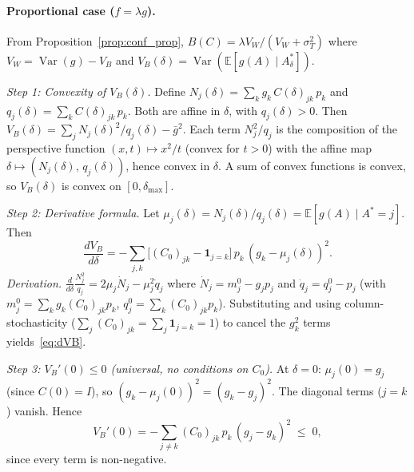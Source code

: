 \paragraph{Proportional case ($f=\lambda g$).}
From Proposition~\ref{prop:conf_prop}, $B(C)=\lambda V_W/(V_W+\sigma_T^2)$ where $V_W=\operatorname{Var}(g)-V_B$ and $V_B(\delta)=\operatorname{Var}(\mathbb{E}[g(A)\mid A^*_\delta])$.

\emph{Step 1: Convexity of $V_B(\delta)$.}
Define $N_j(\delta)=\sum_k g_k\,C(\delta)_{jk}\,p_k$ and $q_j(\delta)=\sum_k C(\delta)_{jk}\,p_k$.
Both are affine in $\delta$, with $q_j(\delta)>0$.
Then $V_B(\delta)=\sum_j N_j(\delta)^2/q_j(\delta) - \bar{g}^2$.
Each term $N_j^2/q_j$ is the composition of the perspective function $(x,t)\mapsto x^2/t$ (convex for $t>0$) with the affine map $\delta\mapsto(N_j(\delta),\,q_j(\delta))$, hence convex in $\delta$.
A sum of convex functions is convex, so $V_B(\delta)$ is convex on $[0,\delta_{\max}]$.

\emph{Step 2: Derivative formula.}
Let $\mu_j(\delta)=N_j(\delta)/q_j(\delta)=\mathbb{E}[g(A)\mid A^*{=}j]$.
Then
\begin{equation}
\frac{dV_B}{d\delta}
= -\sum_{j,k}\bigl[(C_0)_{jk}-\mathbf{1}_{j=k}\bigr]\,p_k\,(g_k-\mu_j(\delta))^2.
\label{eq:dVB}
\end{equation}
\emph{Derivation.}
$\frac{d}{d\delta}\frac{N_j^2}{q_j}=2\mu_j\dot{N}_j-\mu_j^2\dot{q}_j$
where $\dot{N}_j=m_j^0-g_jp_j$ and $\dot{q}_j=q_j^0-p_j$ (with $m_j^0=\sum_k g_k(C_0)_{jk}p_k$, $q_j^0=\sum_k(C_0)_{jk}p_k$).
Substituting and using column-stochasticity ($\sum_j(C_0)_{jk}=\sum_j\mathbf{1}_{j=k}=1$) to cancel the $g_k^2$ terms yields~\eqref{eq:dVB}.

\emph{Step 3: $V_B'(0)\leq 0$ (universal, no conditions on $C_0$).}
At $\delta{=}0$: $\mu_j(0)=g_j$ (since $C(0)=I$), so $(g_k-\mu_j(0))^2=(g_k-g_j)^2$.
The diagonal terms ($j{=}k$) vanish.
Hence
\[
V_B'(0)=-\sum_{j\neq k}(C_0)_{jk}\,p_k\,(g_j-g_k)^2\;\leq\; 0,
\]
since every term is non-negative.

